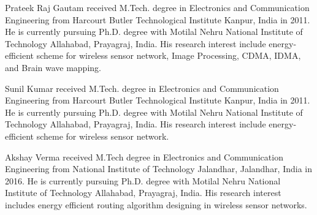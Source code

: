 
 
 
 
 
 
 
  \vspace*{-2\baselineskip}
\begin{IEEEbiography}{Prateek Raj Gautam}
received M.Tech. degree in Electronics and Communication Engineering from
Harcourt Butler Technological Institute Kanpur, India in 2011. He is currently pursuing Ph.D.
degree with Motilal Nehru National Institute of Technology Allahabad, Prayagraj, India. His
research interest include energy-efficient scheme for wireless sensor network, Image Processing,
CDMA, IDMA, and Brain wave mapping.
\end{IEEEbiography}
\vspace{-1cm}
\begin{IEEEbiography}{Sunil Kumar}
    received M.Tech. degree in Electronics and Communication Engineering from
    Harcourt Butler Technological Institute Kanpur, India in 2011. He is currently pursuing Ph.D.
    degree with Motilal Nehru National Institute of Technology Allahabad, Prayagraj, India. His
    research interest include energy-efficient scheme for wireless sensor network.
\end{IEEEbiography}
\vspace{-1cm}
\begin{IEEEbiography}{Akshay Verma}
    received M.Tech degree in Electronics and Communication Engineering from
    National Institute of Technology Jalandhar, Jalandhar, India in 2016. He is currently pursuing Ph.D.
    degree with Motilal Nehru National Institute of Technology Allahabad, Prayagraj, India. His research interest includes energy efficient routing algorithm designing in wireless sensor networks.
\end{IEEEbiography}
\vspace*{30em}
\vfill

